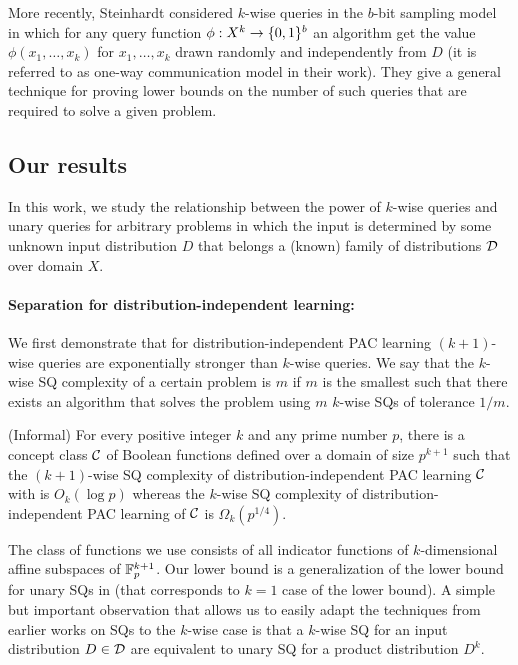 More recently, Steinhardt \etal \cite{SteinhardtVW16} considered $k$-wise queries in the $b$-bit sampling model in which for any query function $\phi:X^k \to \{0, 1\}^{b}$ an algorithm get the value $\phi(x_1,\ldots,x_k)$ for $x_1,\ldots,x_k$ drawn randomly and independently from $D$ (it is referred to as one-way communication model in their work). They give a general technique for proving lower bounds on the number of such queries that are required to solve a given problem.

\subsection{Our results}
In this work, we study the relationship between the power of $k$-wise queries and unary queries for arbitrary problems in which the input is determined by some unknown input distribution $D$ that belongs a (known) family of distributions $\mathcal{D}$ over domain $X$. %

\paragraph{Separation for distribution-independent learning:}
We first demonstrate that for distribution-independent PAC learning $(k+1)$-wise queries are exponentially stronger than $k$-wise queries. We say that the $k$-wise SQ complexity of a certain problem is $m$ if $m$ is the smallest such that there exists an algorithm that solves the problem using $m$ $k$-wise SQs of tolerance $1/m$.
\begin{theorem}\label{thm:k_wise_sep} (Informal)
For every positive integer $k$ and any prime number $p$, there is a concept class $\mathcal{C}$ of Boolean functions defined over a domain of size $p^{k+1}$ such that the $(k+1)$-wise SQ complexity of distribution-independent PAC learning $\mathcal{C}$ with is $O_k(\log{p})$ whereas the $k$-wise SQ complexity of distribution-independent PAC learning of $\mathcal{C}$ is $\Omega_k(p^{1/4})$.
\end{theorem}

The class of functions we use consists of all indicator functions of $k$-dimensional affine subspaces of $\mathbb{F}_p^{k+1}$. Our lower bound is a generalization of the lower bound for unary SQs in \cite{Feldman:16sqd} (that corresponds to $k=1$ case of the lower bound). A simple but important observation that allows us to easily adapt the techniques from earlier works on SQs to the $k$-wise case is that a $k$-wise SQ for an input distribution $D \in \mathcal{D}$ are equivalent to unary SQ for a product distribution $D^k$.

